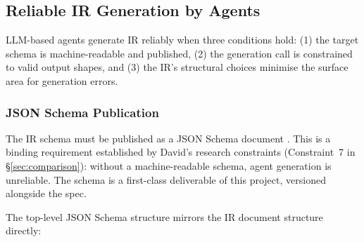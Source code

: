 \subsection{Reliable IR Generation by Agents}
\label{sec:agent-ir-generation}

LLM-based agents generate IR reliably when three conditions hold: (1) the target schema
is machine-readable and published, (2) the generation call is constrained to valid
output shapes, and (3) the IR's structural choices minimise the surface area for
generation errors.

\subsubsection{JSON Schema Publication}
\label{sec:json-schema}

The IR schema must be published as a JSON Schema document \cite{openai-structured-outputs}.
This is a binding requirement established by David's research constraints (Constraint~7 in
\S\ref{sec:comparison}): without a machine-readable schema, agent generation is
unreliable. The schema is a first-class deliverable of this project, versioned alongside
the spec.

The top-level JSON Schema structure mirrors the IR document structure directly:

